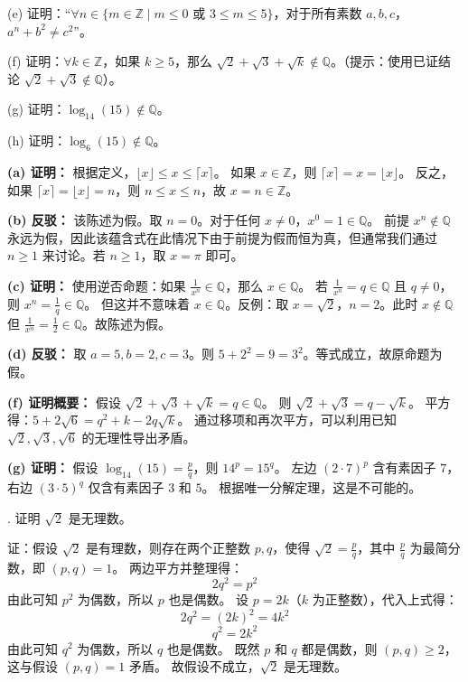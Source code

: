 \begin{questions}
(e) 证明：“$\forall n \in \{m \in \mathbb{Z} \mid m \le 0 \text{ 或 } 3 \le m \le 5\}$，对于所有素数 $a, b, c$，$a^n + b^2 \neq c^2$”。

(f) 证明：$\forall k \in \mathbb{Z}$，如果 $k \ge 5$，那么 $\sqrt{2} + \sqrt{3} + \sqrt{k} \notin \mathbb{Q}$。（提示：使用已证结论 $\sqrt{2} + \sqrt{3} \notin \mathbb{Q}$）。

(g) 证明：$\log_{14}(15) \notin \mathbb{Q}$。

(h) 证明：$\log_{6}(15) \notin \mathbb{Q}$。

\begin{solution}
\textbf{(a) 证明：}
根据定义，$\lfloor x \rfloor \le x \le \lceil x \rceil$。
如果 $x \in \mathbb{Z}$，则 $\lceil x \rceil = x = \lfloor x \rfloor$。
反之，如果 $\lceil x \rceil = \lfloor x \rfloor = n$，则 $n \le x \le n$，故 $x = n \in \mathbb{Z}$。

\textbf{(b) 反驳：}
该陈述为假。取 $n = 0$。对于任何 $x \neq 0$，$x^0 = 1 \in \mathbb{Q}$。
前提 $x^n \notin \mathbb{Q}$ 永远为假，因此该蕴含式在此情况下由于前提为假而恒为真，但通常我们通过 $n \ge 1$ 来讨论。若 $n \ge 1$，取 $x = \pi$ 即可。

\textbf{(c) 证明：}
使用逆否命题：如果 $\frac{1}{x^n} \in \mathbb{Q}$，那么 $x \in \mathbb{Q}$。
若 $\frac{1}{x^n} = q \in \mathbb{Q}$ 且 $q \neq 0$，则 $x^n = \frac{1}{q} \in \mathbb{Q}$。
但这并不意味着 $x \in \mathbb{Q}$。反例：取 $x = \sqrt{2}$，$n = 2$。此时 $x \notin \mathbb{Q}$ 但 $\frac{1}{x^n} = \frac{1}{2} \in \mathbb{Q}$。故陈述为假。

\textbf{(d) 反驳：}
取 $a = 5, b = 2, c = 3$。则 $5 + 2^2 = 9 = 3^2$。等式成立，故原命题为假。

\textbf{(f) 证明概要：}
假设 $\sqrt{2} + \sqrt{3} + \sqrt{k} = q \in \mathbb{Q}$。
则 $\sqrt{2} + \sqrt{3} = q - \sqrt{k}$。
平方得：$5 + 2\sqrt{6} = q^2 + k - 2q\sqrt{k}$。
通过移项和再次平方，可以利用已知 $\sqrt{2}, \sqrt{3}, \sqrt{6}$ 的无理性导出矛盾。

\textbf{(g) 证明：}
假设 $\log_{14}(15) = \frac{p}{q}$，则 $14^p = 15^q$。
左边 $(2 \cdot 7)^p$ 含有素因子 $7$，右边 $(3 \cdot 5)^q$ 仅含有素因子 $3$ 和 $5$。
根据唯一分解定理，这是不可能的。
\end{solution}

    . 证明 $\sqrt{2}$ 是无理数。

\begin{solution}
证：假设 $\sqrt{2}$ 是有理数，则存在两个正整数 $p, q$，使得 $\sqrt{2} = \frac{p}{q}$，其中 $\frac{p}{q}$ 为最简分数，即 $(p, q) = 1$。
两边平方并整理得：
\[
2q^2 = p^2
\]
由此可知 $p^2$ 为偶数，所以 $p$ 也是偶数。
设 $p = 2k$（$k$ 为正整数），代入上式得：
\[
2q^2 = (2k)^2 = 4k^2
\]
\[
q^2 = 2k^2
\]
由此可知 $q^2$ 为偶数，所以 $q$ 也是偶数。
既然 $p$ 和 $q$ 都是偶数，则 $(p, q) \geq 2$，这与假设 $(p, q) = 1$ 矛盾。
故假设不成立，$\sqrt{2}$ 是无理数。
\end{solution}


\end{questions}
